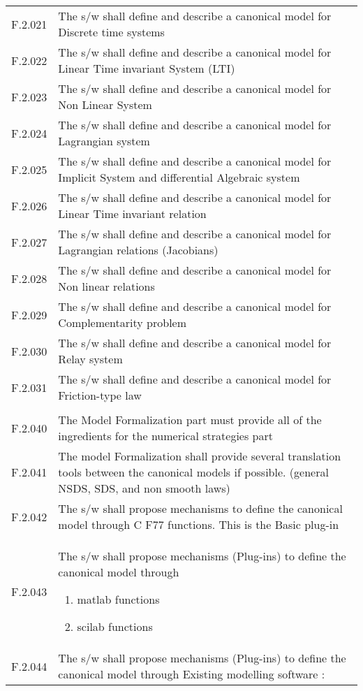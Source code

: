 \begin{longtable}{%
    |>{\columncolor[gray]{.8}}p{}%
    |>{\columncolor[gray]{.95}}p{}|}
  F.2.021  &  The s/w shall  define and describe a canonical model for Discrete time systems\\
  F.2.022  &  The s/w shall  define and describe a canonical model for Linear Time invariant System (LTI)\\ 
  F.2.023  &  The s/w shall  define and describe a canonical model for Non Linear System \\
  F.2.024  &  The s/w shall  define and describe a canonical model for Lagrangian system\\
  F.2.025  &  The s/w shall  define and describe a canonical model for Implicit System and differential Algebraic system\\
  F.2.026  &  The s/w shall  define and describe a canonical model for Linear Time invariant relation  \\  
  F.2.027  &  The s/w shall  define and describe a canonical model for Lagrangian relations (Jacobians)\\  
  F.2.028  &  The s/w shall  define and describe a canonical model for Non linear relations            \\  
  F.2.029  &  The s/w shall  define and describe a canonical model for Complementarity problem   \\  
  F.2.030  &  The s/w shall  define and describe a canonical model for Relay system              \\  
  F.2.031  &  The s/w shall  define and describe a canonical model for Friction-type law\\ 
  & \\
  F.2.040  &  The Model Formalization part must provide all of the ingredients for the numerical strategies part \\
  F.2.041  &  The model Formalization shall provide several  translation tools between the  canonical models if possible. (general NSDS, SDS, and non smooth laws) \\
  F.2.042  &   The s/w shall propose mechanisms to define the canonical model through C F77 functions. This is the Basic plug-in \\
  F.2.043  &   The s/w shall propose mechanisms (Plug-ins) to define the canonical model through 
  \begin{enumerate}
  \item \ac{matlab} functions 
  \item \ac{scilab} functions
  \end{enumerate}\\
  F.2.044  &   The s/w shall propose mechanisms (Plug-ins) to define the canonical model through Existing modelling software :

\end{longtable}
